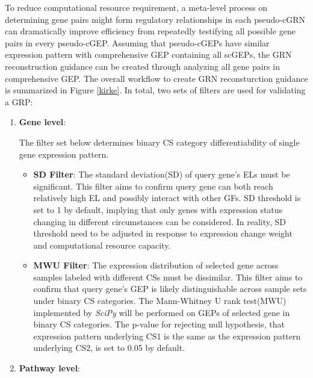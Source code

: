 \documentclass[fleqn,10pt]{wlscirep}
\begin{document}
To reduce computational resource requirement, a meta-level process on determining gene pairs might form regulatory relationships in each pseudo-cGRN can dramatically improve efficiency from repeatedly testifying all possible gene pairs in every pseudo-cGEP.
Assuming that pseudo-cGEPs have similar expression pattern with comprehensive GEP containing all scGEPs, the GRN reconstruction guidance can be created through analyzing all gene pairs in comprehensive GEP.
The overall workflow to create GRN reconsturction guidance is summarized in Figure \ref{kirke}.
In total, two sets of filters are used for validating a GRP:
\begin{enumerate}
\setlength\itemsep{0em}
\item {\textbf{Gene level}}:

The filter set below determines binary CS category differentiability of single gene expression pattern.
\begin{itemize}
\setlength\itemsep{0em}
\item \textbf{SD Filter}: The standard deviation(SD) of query gene’s ELs must be significant.
This filter aims to confirm query gene can both reach relatively high EL and possibly interact with other GFs.
SD threshold is set to 1 by default, implying that only genes with expression status changing in different circumstances can be considered.
In reality, SD threshold need to be adjusted in response to expression change weight and computational resource capacity.

\item \textbf{MWU Filter}: The expression distribution of selected gene across samples labeled with different CSs must be dissimilar.
This filter aims to confirm that query gene's GEP is likely distinguishable across sample sets under binary CS categories.
The Mann-Whitney U rank test(MWU) implemented by \emph{SciPy}\cite{2020SciPy-NMeth} will be performed on GEPs of selected gene in binary CS categories.
The p-value for rejecting null hypothesis, that expression pattern underlying CS1 is the same as the expression pattern underlying CS2, is set to 0.05 by default.
\end{itemize}

\item {\textbf{Pathway level}}:


\end{enumerate}
\end{document}

